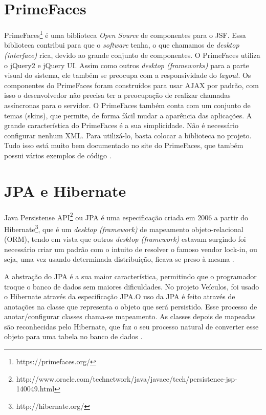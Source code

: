 \section{PrimeFaces}
\label{sec:embasamentoTeoricoPrimeFaces}

PrimeFaces\footnote{https://primefaces.org/} é uma biblioteca \textit{Open Source} de componentes para o JSF. Essa biblioteca contribui para que o \textit{software} tenha, o que chamamos de \textit{desktop (interface)} rica, devido ao grande conjunto de componentes. O PrimeFaces utiliza o jQuery2 e jQuery UI. Assim como outros \textit{desktop (frameworks)} para a parte visual do sistema, ele também se preocupa com a responsividade do \textit{layout}.
Os componentes do PrimeFaces foram construídos para usar AJAX por padrão, com isso o desenvolvedor não precisa ter a preocupação de realizar chamadas assíncronas para o servidor. O PrimeFaces também conta com um conjunto de temas (skins), que permite, de forma fácil mudar a aparência das aplicações.
A grande característica do PrimeFaces é a sua simplicidade. Não é necessário configurar nenhum XML. Para utilizá-lo, basta colocar a biblioteca no projeto. Tudo isso está muito bem documentado no site do PrimeFaces, que também possui vários exemplos de código \cite{Civici2015}.

\section{JPA e Hibernate}
\label{sec:embasamentoTeoricoJPA}

Java Persistense API\footnote{ http://www.oracle.com/technetwork/java/javaee/tech/persistence-jsp-140049.html} ou JPA é uma especificação criada em 2006 a partir do Hibernate\footnote{http://hibernate.org/}, que é um \textit{desktop (framework)} de mapeamento objeto-relacional (ORM), tendo em vista que outros \textit{desktop (framework)} estavam surgindo foi necessário criar um padrão com o intuito de resolver o famoso vendor lock-in, ou seja, uma vez usando determinada distribuição, ficava-se preso à mesma \cite[p.~12]{Cordeiro2014}.

A abstração do JPA é a sua maior característica, permitindo que o programador troque o banco de dados sem maiores dificuldades. No projeto Veículos, foi usado o Hibernate através da especificação JPA.O uso da JPA é feito através de anotações na classe que representa o objeto que será persistido. Esse processo de anotar/configurar classes chama-se mapeamento. As classes depois de mapeadas são reconhecidas pelo Hibernate, que faz o seu processo natural de converter esse objeto para uma tabela no banco de dados \cite{Cordeiro2014}.


